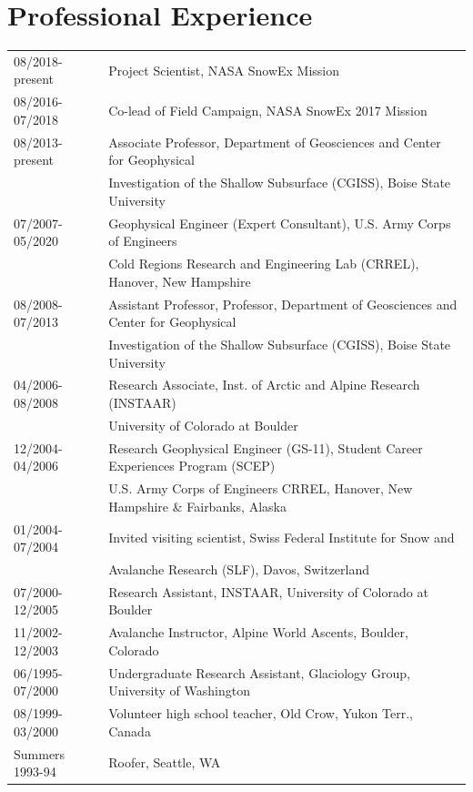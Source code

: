 \documentclass[11pt]{article}
\begin{document}
\section*{Professional Experience}
\begin{tabular}{ll}
08/2018-present & Project Scientist, NASA SnowEx Mission  \\
08/2016-07/2018 & Co-lead of Field Campaign, NASA SnowEx 2017 Mission \\
08/2013-present & Associate Professor, Department of Geosciences and Center for Geophysical \\
&   Investigation of the Shallow Subsurface (CGISS), Boise State University \\
07/2007-05/2020 & Geophysical Engineer (Expert Consultant), U.S. Army Corps of Engineers \\
& Cold Regions Research and Engineering Lab (CRREL), Hanover, New Hampshire \\
08/2008-07/2013 & Assistant Professor, Professor, Department of Geosciences and Center for Geophysical \\
&   Investigation of the Shallow Subsurface (CGISS), Boise State University \\
04/2006-08/2008 & Research Associate, Inst. of Arctic and Alpine Research (INSTAAR) \\
& University of Colorado at Boulder \\ 
12/2004-04/2006 & Research Geophysical Engineer (GS-11), Student Career Experiences Program (SCEP) \\
& U.S. Army Corps of Engineers CRREL, Hanover, New Hampshire \& Fairbanks, Alaska \\
01/2004-07/2004 & Invited visiting scientist, Swiss Federal Institute for Snow and \\ 
& Avalanche Research (SLF), Davos, Switzerland \\ 
07/2000-12/2005 & Research Assistant, INSTAAR, University of Colorado at Boulder \\
11/2002-12/2003 & Avalanche Instructor, Alpine World Ascents, Boulder, Colorado \\
06/1995-07/2000 & Undergraduate Research Assistant, Glaciology Group, University of Washington \\
08/1999-03/2000 & Volunteer high school teacher, Old Crow, Yukon Terr., Canada \\
Summers 1993-94 & Roofer, Seattle, WA \\
\end{tabular}
\end{document}
